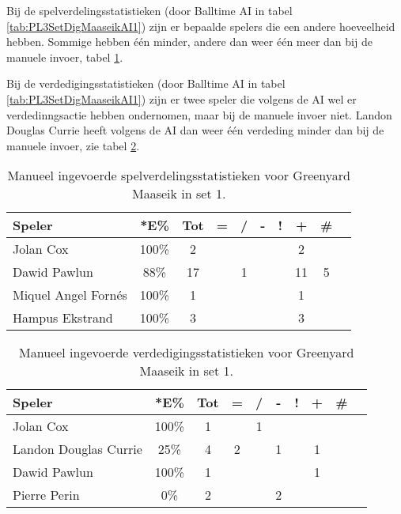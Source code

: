 Bij de spelverdelingsstatistieken (door Balltime AI in tabel \ref{tab:PL3SetDigMaaseikAI1}) zijn er bepaalde spelers die een andere hoeveelheid hebben. Sommige hebben één minder, andere dan weer één meer dan bij de manuele invoer, tabel \ref{tab:PL3SetMaaseikMan1}.

Bij de verdedigingsstatistieken (door Balltime AI in tabel \ref{tab:PL3SetDigMaaseikAI1}) zijn er twee speler die volgens de AI wel er verdedinngsactie hebben ondernomen, maar bij de manuele invoer niet. Landon Douglas Currie heeft volgens de AI dan weer één verdeding minder dan bij de manuele invoer, zie tabel \ref{tab:PL3DigMaaseikMan1}.

\begin{table}[ht!]
    \centering
    \scriptsize
    \begin{tabular}{|l|c|c|c|c|c|c|c|c|c|} \hline
        \textbf{Speler} & *E\% & Tot & = & / & - & ! & + & \# \\ \hline
        Jolan Cox & 100\% & 2 &  &  &  &  & 2 &  \\ 
        Dawid Pawlun & 88\% & 17 &  & 1 &  &  & 11 & 5 \\ 
        Miquel Angel Fornés & 100\% & 1 &  &  &  &  & 1 &  \\ 
        Hampus Ekstrand & 100\% & 3 &  &  &  &  & 3 &  \\ \hline
    \end{tabular}
    \caption[Manueel ingevoerde spelverdelingsstatistieken voor Greenyard Maaseik in set 1]{\label{tab:PL3SetMaaseikMan1}Manueel ingevoerde spelverdelingsstatistieken voor Greenyard Maaseik in set 1.}
\end{table}

\begin{table}[ht!]
    \centering
    \scriptsize
    \begin{tabular}{|l|c|c|c|c|c|c|c|c|c|} \hline
        \textbf{Speler} & *E\% & Tot & = & / & - & ! & + & \# \\ \hline
        Jolan Cox & 100\% & 1 &  & 1 &  &  &  & \\
        Landon Douglas Currie & 25\% & 4 & 2 &  & 1 &  & 1 & \\ 
        Dawid Pawlun & 100\% & 1 &  &  &  &  & 1 & \\
        Pierre Perin & 0\% & 2 &  &  & 2 &  &  &  \\ \hline
    \end{tabular}
    \caption[Manueel ingevoerde verdedigingsstatistieken voor Greenyard Maaseik in set 1]{\label{tab:PL3DigMaaseikMan1}Manueel ingevoerde verdedigingsstatistieken voor Greenyard Maaseik in set 1.}
\end{table}

